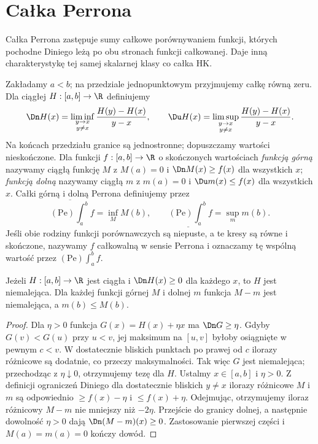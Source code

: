 \section{Całka Perrona}
\providecommand{\atlasref}[2]{#2}
Całka Perrona zastępuje sumy całkowe porównywaniem funkcji, których pochodne Diniego leżą po obu stronach funkcji całkowanej. Daje inną charakterystykę tej samej skalarnej klasy co całka HK.
\begin{definicja}\label{it:def:perron}
Zakładamy $a<b$; na przedziale jednopunktowym przyjmujemy całkę równą zeru.
Dla ciągłej $H:[a,b]\to\R$ definiujemy
\[
\Dn H(x)=\liminf_{\substack{y\to x\\y\ne x}}\frac{H(y)-H(x)}{y-x},\qquad
\Du H(x)=\limsup_{\substack{y\to x\\y\ne x}}\frac{H(y)-H(x)}{y-x}.
\]
Na końcach przedziału granice są jednostronne; dopuszczamy wartości nieskończone. Dla funkcji $f:[a,b]\to\R$ o skończonych wartościach \emph{funkcją górną} nazywamy ciągłą funkcję $M$ z $M(a)=0$ i $\Dn M(x)\ge f(x)$ dla wszystkich $x$; \emph{funkcją dolną} nazywamy ciągłą $m$ z $m(a)=0$ i $\Du m(x)\le f(x)$ dla wszystkich $x$. Całki górną i dolną Perrona definiujemy przez
\[
\overline{(\mathrm{Pe})\!\int_a^b}f=\inf_M M(b),\qquad
\underline{(\mathrm{Pe})\!\int_a^b}f=\sup_m m(b).
\]
Jeśli obie rodziny funkcji porównawczych są niepuste, a te kresy są równe i skończone, nazywamy $f$ całkowalną w sensie Perrona i oznaczamy tę wspólną wartość przez $(\mathrm{Pe})\int_a^b f$.
\end{definicja}
\begin{lemat}\label{it:lem:perron-order}\label{ma1:kh:lem:perron-order}
Jeżeli $H:[a,b]\to\R$ jest ciągła i $\Dn H(x)\ge0$ dla każdego $x$, to $H$ jest niemalejąca. Dla każdej funkcji górnej $M$ i dolnej $m$ funkcja $M-m$ jest niemalejąca, a $m(b)\le M(b)$.
\end{lemat}
\begin{proof}
Dla $\eta>0$ funkcja $G(x)=H(x)+\eta x$ ma $\Dn G\ge\eta$. Gdyby $G(v)<G(u)$ przy $u<v$, jej maksimum na $[u,v]$ byłoby osiągnięte w pewnym $c<v$. W dostatecznie bliskich punktach po prawej od $c$ ilorazy różnicowe są dodatnie, co przeczy maksymalności. Tak więc $G$ jest niemalejąca; przechodząc z $\eta\downarrow0$, otrzymujemy tezę dla $H$. Ustalmy $x\in[a,b]$ i $\eta>0$. Z definicji ograniczeń Diniego dla dostatecznie bliskich $y\ne x$ ilorazy różnicowe $M$ i $m$ są odpowiednio $\ge f(x)-\eta$ i $\le f(x)+\eta$. Odejmując, otrzymujemy iloraz różnicowy $M-m$ nie mniejszy niż $-2\eta$. Przejście do granicy dolnej, a następnie dowolność $\eta>0$ dają $\Dn(M-m)(x)\ge0$. Zastosowanie pierwszej części i $M(a)=m(a)=0$ kończy dowód.
\end{proof}
